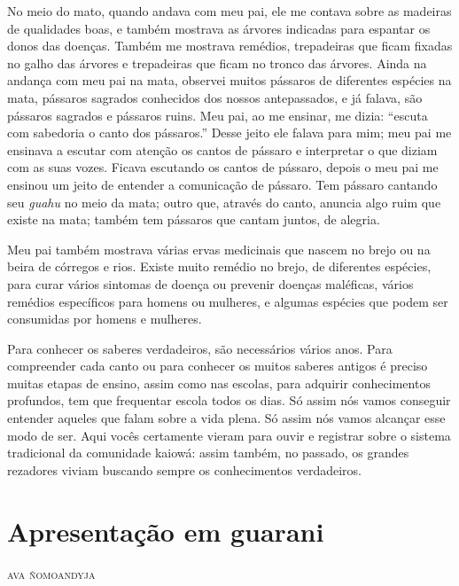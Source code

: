 No meio do mato, quando andava com meu pai, ele me contava sobre as
madeiras de qualidades boas, e também mostrava as árvores indicadas para
espantar os donos das doenças. Também me mostrava remédios, trepadeiras
que ficam fixadas no galho das árvores e trepadeiras que ficam no tronco
das árvores. Ainda na andança com meu pai na mata, observei muitos
pássaros de diferentes espécies na mata, pássaros sagrados conhecidos
dos nossos antepassados, e já falava, são pássaros sagrados e pássaros
ruins. Meu pai, ao me ensinar, me dizia: ``escuta com sabedoria o canto
dos pássaros.'' Desse jeito ele falava para mim; meu pai me ensinava a
escutar com atenção os cantos de pássaro e interpretar o que diziam com
as suas vozes. Ficava escutando os cantos de pássaro, depois o meu pai
me ensinou um jeito de entender a comunicação de pássaro. Tem pássaro
cantando seu \emph{guahu} no meio da mata; outro que, através do canto,
anuncia algo ruim que existe na mata; também tem pássaros que cantam
juntos, de alegria.

Meu pai também mostrava várias ervas medicinais que nascem no brejo ou
na beira de córregos e rios. Existe muito remédio no brejo, de
diferentes espécies, para curar vários sintomas de doença ou prevenir
doenças maléficas, vários remédios específicos para homens ou mulheres,
e algumas espécies que podem ser consumidas por homens e mulheres.

Para conhecer os saberes verdadeiros, são necessários vários anos. Para
compreender cada canto ou para conhecer os muitos saberes antigos é
preciso muitas etapas de ensino, assim como nas escolas, para adquirir
conhecimentos profundos, tem que frequentar escola todos os dias. Só
assim nós vamos conseguir entender aqueles que falam sobre a vida plena.
Só assim nós vamos alcançar esse modo de ser. Aqui vocês certamente
vieram para ouvir e registrar sobre o sistema tradicional da comunidade
kaiowá: assim também, no passado, os grandes rezadores viviam buscando
sempre os conhecimentos verdadeiros.

\chapter*{Apresentação em guarani\smallskip{}}

\begin{flushright}
\textsc{ava ñomoandyja}
\end{flushright}

